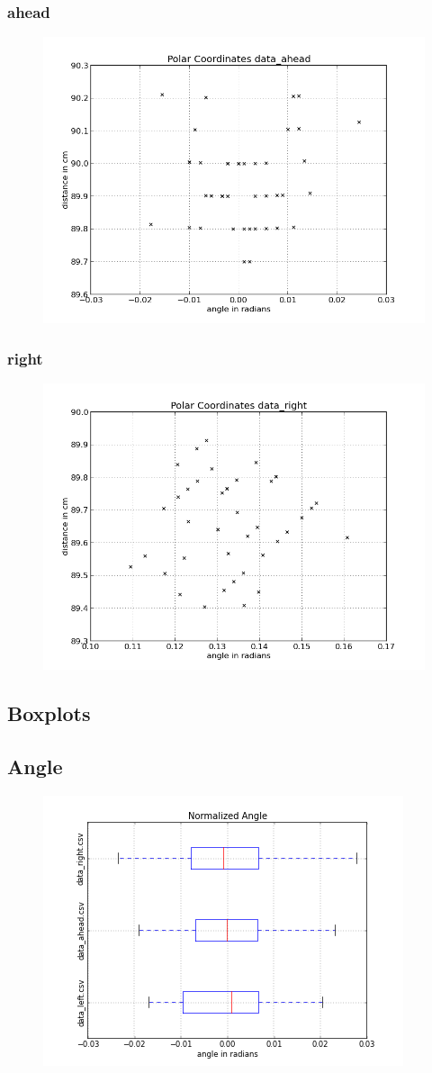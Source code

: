 \documentclass{scrartcl}
\begin{document}
\subsubsection{ahead}
\begin{figure}[H]
  \centering
  \includegraphics[width=0.5\linewidth]{img/data_ahead_pc.png}
\end{figure}

\subsubsection{right}
\begin{figure}[H]
  \centering
  \includegraphics[width=0.5\linewidth]{img/data_right_pc.png}
\end{figure}


\subsection{Boxplots}

\subsection{Angle}

\begin{figure}[H]
  \centering
  \includegraphics[width=0.5\linewidth]{img/BoxplotAngleNorm.png}
\end{figure}
\end{document}
